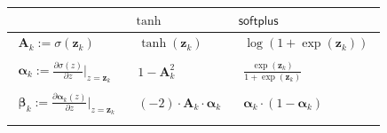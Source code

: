 \documentclass[a4paper, 12pt]{scrartcl}
\begin{document}
\begin{center}
    \begin{tabular}{ l l l}\label{table:activation_functions}
        & $\tanh$ & $\mathsf{softplus}$ \\[0.5em] \hline
        \noalign{\vspace{0.5em}}
        $\begin{aligned}
            \bm{A}_k := \sigma\left(\bm{z}_k\right)
        \end{aligned}$
        &
        $\begin{aligned}
            \tanh\!\left(\bm{z}_k \right)
        \end{aligned}$
        &
        $\begin{aligned}
            \log\!\left(1 + \exp(\bm{z}_k) \right)
        \end{aligned}$ 
        \\[0.5em] \hline
        \noalign{\vspace{0.5em}}
        $\begin{aligned}
            \bm{\alpha}_k :=\frac{\partial \sigma(z)}{\partial z} \bigg|_{z = \bm{z}_k}
        \end{aligned}$
        &
        $\begin{aligned}
            1 - \bm{A}_k^2
        \end{aligned}$
        &
        $\begin{aligned}
            \frac{\exp(\bm{z}_k)}{1 + \exp(\bm{z}_k)}
        \end{aligned}$ 
        \\[0.5em] \hline
        \noalign{\vspace{0.5em}}
        $\begin{aligned}
            \bm{\beta}_k :=\frac{\partial \bm{\alpha}_k(z)}{\partial z} \bigg|_{z = \bm{z}_k}
        \end{aligned}$
        &
        $\begin{aligned}
            (-2) \cdot \bm{A}_k \cdot  \bm{\alpha}_k
        \end{aligned}$
        &
        $\begin{aligned}
            \bm{\alpha}_k \cdot \left(1 - \bm{\alpha}_k \right)
        \end{aligned}$ 
        \\[0.5em] \hline
        \noalign{\vspace{0.5em}}

\end{tabular}
\end{center}
\end{document}
